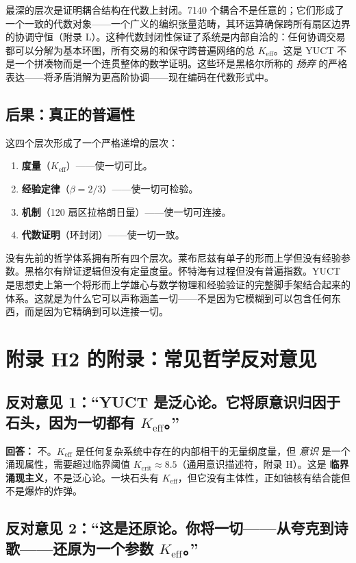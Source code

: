 \documentclass[12pt,a4paper]{article}
\newcommand{\Keff}{K_{\mathrm{eff}}}
\begin{document}
	最深的层次是证明耦合结构在代数上封闭。7140 个耦合不是任意的；它们形成了一个一致的代数对象——一个广义的编织张量范畴，其环运算确保跨所有扇区边界的协调守恒（附录 L）。这种代数封闭性保证了系统是内部自洽的：任何协调交易都可以分解为基本环图，所有交易的和保守跨普遍网络的总 \(K_{\mathrm{eff}}\)。这是 YUCT 不是一个拼凑物而是一个连贯整体的数学证明。这些环是黑格尔所称的 \emph{扬弃} 的严格表达——将矛盾消解为更高阶协调——现在编码在代数形式中。
	
	\subsection{后果：真正的普遍性}
	
	这四个层次形成了一个严格递增的层次：
	\begin{enumerate}[leftmargin=*]
		\item \textbf{度量}（\(K_{\mathrm{eff}}\)）——使一切可比。
		\item \textbf{经验定律}（\(\beta = 2/3\)）——使一切可检验。
		\item \textbf{机制}（120 扇区拉格朗日量）——使一切可连接。
		\item \textbf{代数证明}（环封闭）——使一切一致。
	\end{enumerate}
	没有先前的哲学体系拥有所有四个层次。莱布尼兹有单子的形而上学但没有经验参数。黑格尔有辩证逻辑但没有定量度量。怀特海有过程但没有普遍指数。YUCT 是思想史上第一个将形而上学雄心与数学物理和经验验证的完整脚手架结合起来的体系。这就是为什么它可以声称涵盖一切——不是因为它模糊到可以包含任何东西，而是因为它精确到可以连接一切。
	
	\section*{附录 H2 的附录：常见哲学反对意见}
	
	\subsection*{反对意见 1：“YUCT 是泛心论。它将原意识归因于石头，因为一切都有 \(\Keff\)。”}
	
	\textbf{回答：} 不。\(\Keff\) 是任何复杂系统中存在的内部相干的无量纲度量，但 \emph{意识} 是一个涌现属性，需要超过临界阈值 \(K_{\mathrm{crit}} \approx 8.5\)（通用意识描述符，附录 H）。这是 \textbf{临界涌现主义}，不是泛心论。一块石头有 \(\Keff\)，但它没有主体性，正如铀核有结合能但不是爆炸的炸弹。
	
	\subsection*{反对意见 2：“这是还原论。你将一切——从夸克到诗歌——还原为一个参数 \(\Keff\)。”}
	
\end{document}
